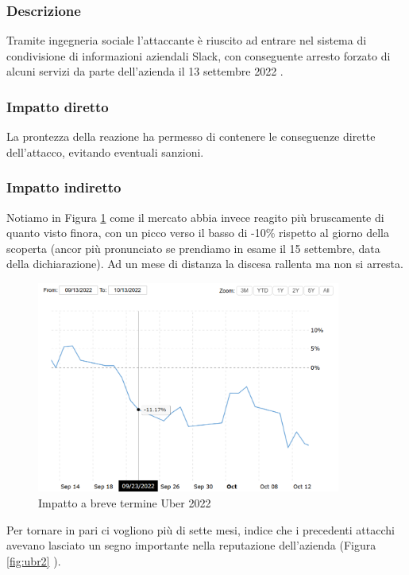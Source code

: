 \documentclass[12pt,a4paper,twoside]{report}
\begin{document}
\subsubsection{Descrizione}
Tramite ingegneria sociale l'attaccante \`e riuscito ad entrare nel sistema di condivisione di informazioni aziendali Slack, con conseguente arresto forzato di alcuni servizi da parte dell'azienda il 13 settembre 2022 \cite{Uber_2022}.\\
\subsubsection{Impatto diretto}
La prontezza della reazione ha permesso di contenere le conseguenze dirette dell'attacco, evitando eventuali sanzioni.\\ 
\subsubsection{Impatto indiretto}
Notiamo in Figura \ref{fig:ubr1} \cite{macrotrends_uber} come il mercato abbia invece reagito pi\`u bruscamente di quanto visto finora, con un picco verso il basso di -10\% rispetto al giorno della scoperta (ancor pi\`u pronunciato se prendiamo in esame il 15 settembre, data della dichiarazione). Ad un mese di distanza la discesa rallenta ma non si arresta.\\

\begin{figure}[H] 
\begin{center} 
\includegraphics[width=10cm]{figures/uber_2022_short.png} 
\caption[Grafico Uber 2022 short]{Impatto a breve termine Uber 2022}\label{fig:ubr1}
\end{center}
\end{figure}

Per tornare in pari ci vogliono pi\`u di sette mesi, indice che i precedenti attacchi avevano lasciato un segno importante nella reputazione dell'azienda (Figura \ref{fig:ubr2} \cite{macrotrends_uber}).\\
\end{document}
